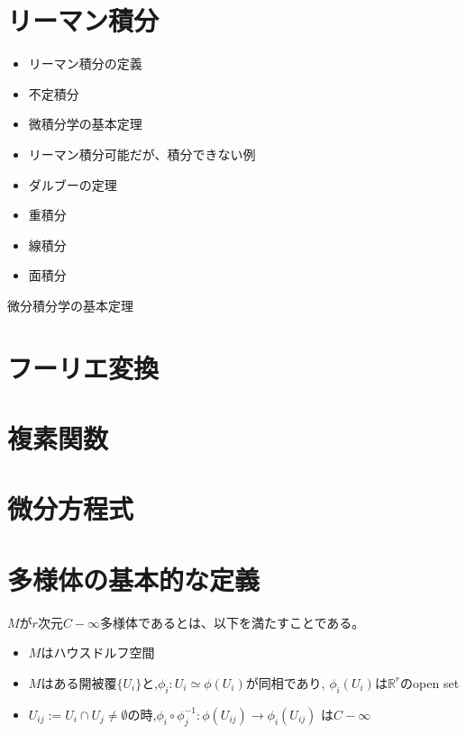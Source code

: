 \documentclass{ujarticle}
\begin{document}
\section{リーマン積分}
\begin{itemize}
\item リーマン積分の定義
\item 不定積分
\item 微積分学の基本定理
\item リーマン積分可能だが、積分できない例
\item ダルブーの定理
\item 重積分
\item 線積分
\item 面積分
\end{itemize}

微分積分学の基本定理

\section{フーリエ変換}


\section{複素関数}

\section{微分方程式}



\section{多様体の基本的な定義}
\begin{dfn}
$M$が$r$次元$C-{\infty}$多様体であるとは、以下を満たすことである。
 \begin{itemize}
   \item $M$はハウスドルフ空間
   \item $M$はある開被覆$\{U_i\}$と,$\phi_i:U_i \simeq \phi(U_i)$が同相であり,
         $\phi_i(U_i)$は$\mathbb{R}^r$のopen set
   \item $U_{ij} := U_i \cap U_j \neq \emptyset$の時,$\phi_i \circ \phi_j^{-1}: \phi(U_{ij}) \to \phi_i(U_{ij})$
         は$C-\infty$
 \end{itemize}
\end{dfn}
\end{document}
